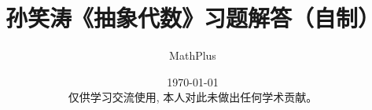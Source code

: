 \documentclass[UTF8,fontset=windows]{ctexart}
\title{孙笑涛《抽象代数》习题解答（自制）}
\author{MathPlus}
\date{
    \today
    \\[2em]
    仅供学习交流使用, 本人对此未做出任何学术贡献。
}
\theoremstyle{dotless}
\begin{document}
\maketitle
\tableofcontents


\clearpage

\clearpage

\clearpage

\clearpage

\clearpage

\nocite{*}


\end{document}
